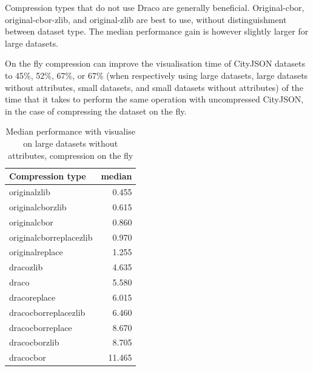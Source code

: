 Compression types that do not use Draco are generally beneficial.
Original-cbor, original-cbor-zlib, and original-zlib are best to use, without distinguishment between dataset type.
The median performance gain is however slightly larger for large datasets.

On the fly compression can improve the visualisation time of CityJSON datasets to 45\%, 52\%, 67\%, or 67\% (when respectively using large datasets, large datasets without attributes, small datasets, and small datasets without attributes) of the time that it takes to perform the same operation with uncompressed CityJSON, in the case of compressing the dataset on the fly.



\begin{table}[!h]
    \begin{minipage}{.5\linewidth}
      \caption{
Median performance with visualise on large datasets, compression on the fly}
\centering

\begin{tabular}{|l|r|}
\hline
Compression type & median\\
\hline
originalzlib & 0.455\\
\hline
originalcborzlib & 0.615\\
\hline
originalcbor & 0.860\\
\hline
originalcborreplacezlib & 0.970\\
\hline
originalreplace & 1.255\\
\hline
dracozlib & 4.635\\
\hline
draco & 5.580\\
\hline
dracoreplace & 6.015\\
\hline
dracocborreplacezlib & 6.460\\
\hline
dracocborreplace & 8.670\\
\hline
dracocborzlib & 8.705\\
\hline
dracocbor & 11.465\\
\hline
\end{tabular}
\end{minipage}%
    \begin{minipage}{.5\linewidth}
      \centering
        \caption{
Median performance with visualise on large datasets without attributes, compression on the fly}


\end{minipage}
\end{table}
